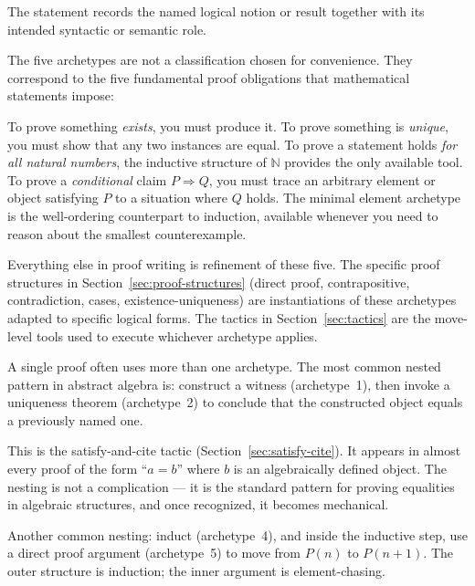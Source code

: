 \begin{remark*}[Interpretation]
The statement records the named logical notion or result together with its
intended syntactic or semantic role.
\end{remark*}


\begin{remark}
The five archetypes are not a classification chosen for convenience.
They correspond to the five fundamental proof obligations that
mathematical statements impose:

To prove something \emph{exists}, you must produce it. To prove something
is \emph{unique}, you must show that any two instances are equal.
To prove a statement holds \emph{for all natural numbers}, the inductive
structure of $\mathbb{N}$ provides the only available tool. To prove a
\emph{conditional} claim $P \Rightarrow Q$, you must trace an arbitrary
element or object satisfying $P$ to a situation where $Q$ holds.
The minimal element archetype is the well-ordering counterpart to
induction, available whenever you need to reason about the smallest
counterexample.

Everything else in proof writing is refinement of these five. The specific
proof structures in Section~\ref{sec:proof-structures} (direct proof,
contrapositive, contradiction, cases, existence-uniqueness) are
instantiations of these archetypes adapted to specific logical forms.
The tactics in Section~\ref{sec:tactics} are the move-level tools
used to execute whichever archetype applies.
\end{remark}

\begin{remark}
A single proof often uses more than one archetype. The most common
nested pattern in abstract algebra is: construct a witness (archetype~1),
then invoke a uniqueness theorem (archetype~2) to conclude that the
constructed object equals a previously named one.

This is the satisfy-and-cite tactic (Section~\ref{sec:satisfy-cite}).
It appears in almost every proof of the form ``$a = b$'' where $b$ is
an algebraically defined object. The nesting is not a complication ---
it is the standard pattern for proving equalities in algebraic structures,
and once recognized, it becomes mechanical.

Another common nesting: induct (archetype~4), and inside the inductive
step, use a direct proof argument (archetype~5) to move from $P(n)$ to
$P(n+1)$. The outer structure is induction; the inner argument is
element-chasing.
\end{remark}

